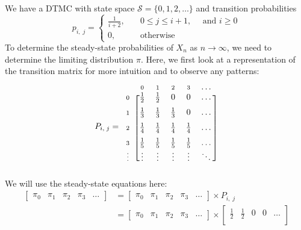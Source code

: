 \documentclass[12pt]{article}
\newcommand{\matindex}[1]{\mbox{\scriptsize#1}}%
\begin{document}
We have a DTMC with state space $\mathcal{S} = \{0,1,2, \dots\}$ and transition probabilities \begin{equation}
    p_{i,\;j} = \begin{cases}
        \frac{1}{i+2}, \quad & 0 \leq j \leq i + 1, \quad \text{ and } i \geq 0 \\ 
        0, \quad &\text{otherwise}
    \end{cases}
\end{equation} To determine the steady-state probabilities of $X_n$ as $n \to \infty$, we need to determine the limiting distribution $\pi$. Here, we first look at a representation of the transition matrix for more intuition and to observe any patterns: \begin{equation*}
    P_{i,\;j} = \begin{blockarray}{cccccc}
        & \matindex{0} & \matindex{1} & \matindex{2} & \matindex{3} & \dots \\ 
        \begin{block}{c[ccccc]}
            \matindex{0} & \frac{1}{2} & \frac{1}{2} & 0 & 0 & \dots\\ [6pt]
            \matindex{1} & \frac{1}{3} & \frac{1}{3} & \frac{1}{3} & 0 & \dots \\ [6pt]
            \matindex{2} & \frac{1}{4} & \frac{1}{4} & \frac{1}{4} & \frac{1}{4} & \dots \\ [6pt]
            \matindex{3} & \frac{1}{5} & \frac{1}{5} & \frac{1}{5} & \frac{1}{5} & \dots \\ 
            \matindex{\vdots} & \vdots & \vdots & \vdots & \vdots & \ddots \\ 
        \end{block}
    \end{blockarray}
\end{equation*} We will use the steady-state equations here: \begin{align*}
    \begin{bmatrix}
        \pi_0 & \pi_1 & \pi_2 & \pi_3 & \dots
    \end{bmatrix} &= \begin{bmatrix}
        \pi_0 & \pi_1 & \pi_2 & \pi_3 & \dots
    \end{bmatrix} \times P_{i,\;j} \\ 
    &= \begin{bmatrix}
        \pi_0 & \pi_1 & \pi_2 & \pi_3 & \dots
    \end{bmatrix} \times \begin{bmatrix}
            \frac{1}{2} & \frac{1}{2} & 0 & 0 & \dots \\

\end{bmatrix}
\end{align*}
\end{document}
